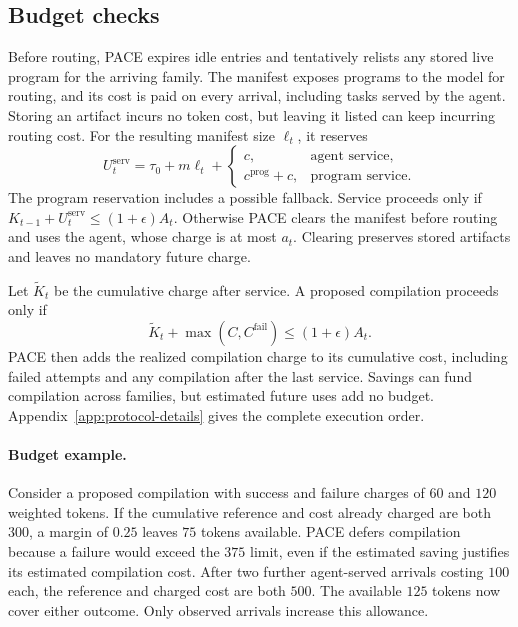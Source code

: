 \subsection{Budget checks}
\label{sec:cost-protection}

Before routing, PACE expires idle entries and tentatively relists any stored live program for the arriving family.
The manifest exposes programs to the model for routing, and its cost is paid on every arrival, including tasks served by the agent.
Storing an artifact incurs no token cost, but leaving it listed can keep incurring routing cost.
For the resulting manifest size $\ell_t$, it reserves
\begin{equation}
U_t^{\mathrm{serv}}=\tau_0+m\ell_t+
\begin{cases}
c,&\text{agent service},\\
c^{\mathrm{prog}}+c,&\text{program service}.
\end{cases}
\label{eq:service-reserve}
\end{equation}
The program reservation includes a possible fallback.
Service proceeds only if $K_{t-1}+U_t^{\mathrm{serv}}\leq(1+\epsilon)A_t$.
Otherwise PACE clears the manifest before routing and uses the agent, whose charge is at most $a_t$.
Clearing preserves stored artifacts and leaves no mandatory future charge.

Let $\widetilde K_t$ be the cumulative charge after service.
A proposed compilation proceeds only if
\begin{equation}
\widetilde K_t+\max(C,C^{\mathrm{fail}})\leq(1+\epsilon)A_t.
\label{eq:compile-admission}
\end{equation}
PACE then adds the realized compilation charge to its cumulative cost, including failed attempts and any compilation after the last service.
Savings can fund compilation across families, but estimated future uses add no budget.
Appendix~\ref{app:protocol-details} gives the complete execution order.

\paragraph{Budget example.}
Consider a proposed compilation with success and failure charges of $60$ and $120$ weighted tokens.
If the cumulative reference and cost already charged are both $300$, a margin of $0.25$ leaves $75$ tokens available.
PACE defers compilation because a failure would exceed the $375$ limit, even if the estimated saving justifies its estimated compilation cost.
After two further agent-served arrivals costing $100$ each, the reference and charged cost are both $500$.
The available $125$ tokens now cover either outcome.
Only observed arrivals increase this allowance.

